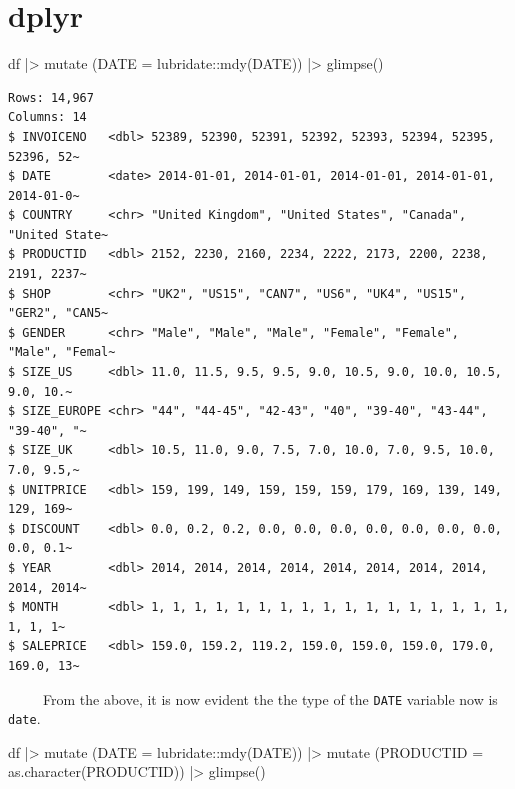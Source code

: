 \documentclass[
  letterpaper,
  DIV=11,
  numbers=noendperiod]{scrreprt}
\newenvironment{Shaded}{\begin{snugshade}}{\end{snugshade}}
\newcommand{\AttributeTok}[1]{\textcolor[rgb]{0.40,0.45,0.13}{#1}}
\newcommand{\FunctionTok}[1]{\textcolor[rgb]{0.28,0.35,0.67}{#1}}
\newcommand{\NormalTok}[1]{\textcolor[rgb]{0.00,0.23,0.31}{#1}}
\newcommand{\SpecialCharTok}[1]{\textcolor[rgb]{0.37,0.37,0.37}{#1}}
\begin{document}
\section{dplyr}

\begin{Shaded}
\begin{Highlighting}[]
\NormalTok{df }\SpecialCharTok{|\textgreater{}}
    \FunctionTok{mutate}\NormalTok{ (}\AttributeTok{DATE =}\NormalTok{ lubridate}\SpecialCharTok{::}\FunctionTok{mdy}\NormalTok{(DATE)) }\SpecialCharTok{|\textgreater{}}
    \FunctionTok{glimpse}\NormalTok{()}
\end{Highlighting}
\end{Shaded}

\begin{verbatim}
Rows: 14,967
Columns: 14
$ INVOICENO   <dbl> 52389, 52390, 52391, 52392, 52393, 52394, 52395, 52396, 52~
$ DATE        <date> 2014-01-01, 2014-01-01, 2014-01-01, 2014-01-01, 2014-01-0~
$ COUNTRY     <chr> "United Kingdom", "United States", "Canada", "United State~
$ PRODUCTID   <dbl> 2152, 2230, 2160, 2234, 2222, 2173, 2200, 2238, 2191, 2237~
$ SHOP        <chr> "UK2", "US15", "CAN7", "US6", "UK4", "US15", "GER2", "CAN5~
$ GENDER      <chr> "Male", "Male", "Male", "Female", "Female", "Male", "Femal~
$ SIZE_US     <dbl> 11.0, 11.5, 9.5, 9.5, 9.0, 10.5, 9.0, 10.0, 10.5, 9.0, 10.~
$ SIZE_EUROPE <chr> "44", "44-45", "42-43", "40", "39-40", "43-44", "39-40", "~
$ SIZE_UK     <dbl> 10.5, 11.0, 9.0, 7.5, 7.0, 10.0, 7.0, 9.5, 10.0, 7.0, 9.5,~
$ UNITPRICE   <dbl> 159, 199, 149, 159, 159, 159, 179, 169, 139, 149, 129, 169~
$ DISCOUNT    <dbl> 0.0, 0.2, 0.2, 0.0, 0.0, 0.0, 0.0, 0.0, 0.0, 0.0, 0.0, 0.1~
$ YEAR        <dbl> 2014, 2014, 2014, 2014, 2014, 2014, 2014, 2014, 2014, 2014~
$ MONTH       <dbl> 1, 1, 1, 1, 1, 1, 1, 1, 1, 1, 1, 1, 1, 1, 1, 1, 1, 1, 1, 1~
$ SALEPRICE   <dbl> 159.0, 159.2, 119.2, 159.0, 159.0, 159.0, 179.0, 169.0, 13~
\end{verbatim}

~~~~~From the above, it is now evident the the type of the \texttt{DATE}
variable now is \texttt{date}.

\begin{Shaded}
\begin{Highlighting}[]
\NormalTok{df }\SpecialCharTok{|\textgreater{}}
    \FunctionTok{mutate}\NormalTok{ (}\AttributeTok{DATE =}\NormalTok{ lubridate}\SpecialCharTok{::}\FunctionTok{mdy}\NormalTok{(DATE)) }\SpecialCharTok{|\textgreater{}}
    \FunctionTok{mutate}\NormalTok{ (}\AttributeTok{PRODUCTID =} \FunctionTok{as.character}\NormalTok{(PRODUCTID)) }\SpecialCharTok{|\textgreater{}}
    \FunctionTok{glimpse}\NormalTok{()}
\end{Highlighting}
\end{Shaded}
\end{document}
